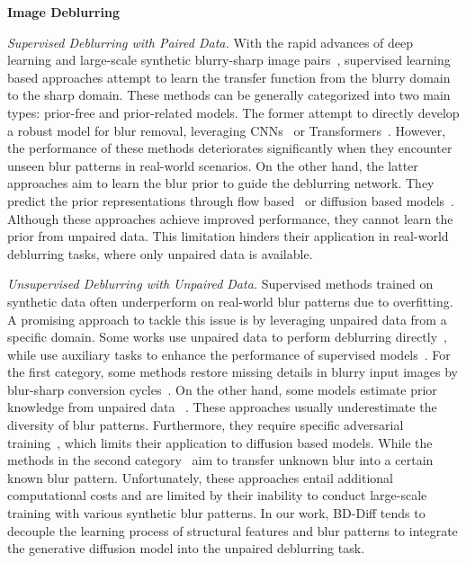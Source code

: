{\bf Image Deblurring}


\textit{Supervised Deblurring with Paired Data.}
With the rapid advances of deep learning and large-scale synthetic blurry-sharp image pairs~\cite{hendrycks2019benchmarking,rim2022realistic}, supervised learning based approaches attempt to learn the transfer function from the blurry domain to the sharp domain. These methods can be generally categorized into two main types: prior-free and prior-related models. The former attempt to directly develop a robust model for blur removal, leveraging CNNs~\cite{chen2022simple,cho2021rethinking,li2022learning,mao2023intriguing} or Transformers~\cite{tsai2022stripformer,kong2023efficient,liang2024image,liu2024deblurdinat}. However, the performance of these methods deteriorates significantly when they encounter unseen blur patterns in real-world scenarios. 
%
On the other hand, the latter approaches aim to learn the blur prior to guide the deblurring network. They predict the prior representations through flow based~\cite{fang2023self,liu2024motion} or diffusion based models~\cite{chen2024hierarchical,laroche2024fast}. Although these approaches achieve improved performance, they cannot learn the prior from unpaired data. This limitation hinders their application in real-world deblurring tasks, where only unpaired data is available.


\textit{Unsupervised Deblurring with Unpaired Data.} Supervised methods trained on synthetic data often underperform on real-world blur patterns due to overfitting. A promising approach to tackle this issue is by leveraging unpaired data from a specific domain. Some works use unpaired data to perform deblurring directly~\cite{zhao2022fcl,zhang2023neural,jiangxin2021learning,ren2020neural,jiang2023uncertainty}, while use auxiliary tasks to enhance the performance of supervised models~\cite{pham2024blur2blur,wu2024id}. 
For the first category, some methods restore missing details in blurry input images by blur-sharp conversion cycles~\cite{yi2017dualgan,zhao2022fcl}. On the other hand, some models estimate prior knowledge from unpaired data ~\cite{zhang2023neural,jiangxin2021learning,ren2020neural,jiang2023uncertainty,dong2021learning}. These approaches usually underestimate the diversity of blur patterns. Furthermore, they require specific adversarial training~\cite{goodfellow2014generative}, which limits their application to diffusion based models. While the methods in the second category~\cite{pham2024blur2blur,wu2024id} aim to transfer unknown blur into a certain known blur pattern. Unfortunately, these approaches entail additional computational costs and are limited by their inability to conduct large-scale training with various synthetic blur patterns. In our work, BD-Diff tends to decouple the learning process of structural features and blur patterns to integrate the generative diffusion model into the unpaired deblurring task.
